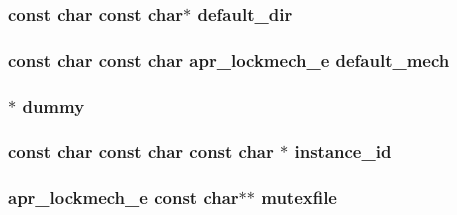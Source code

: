\subsubsection[{\texorpdfstring{default\+\_\+dir}{default_dir}}]{\setlength{\rightskip}{0pt plus 5cm}const char const char$\ast$ default\+\_\+dir}\hypertarget{group__APACHE__CORE__MUTEX_ga56289591e4fc9deed24a16663299f5ea}{}\label{group__APACHE__CORE__MUTEX_ga56289591e4fc9deed24a16663299f5ea}
\subsubsection[{\texorpdfstring{default\+\_\+mech}{default_mech}}]{\setlength{\rightskip}{0pt plus 5cm}const char const char {\bf apr\+\_\+lockmech\+\_\+e} default\+\_\+mech}\hypertarget{group__APACHE__CORE__MUTEX_ga1a18ef0d888b24930ae6acf4619c2883}{}\label{group__APACHE__CORE__MUTEX_ga1a18ef0d888b24930ae6acf4619c2883}
\subsubsection[{\texorpdfstring{dummy}{dummy}}]{$\ast$ dummy}\hypertarget{group__APACHE__CORE__MUTEX_ga99dc3b67257851cb91efea473083cd0f}{}\label{group__APACHE__CORE__MUTEX_ga99dc3b67257851cb91efea473083cd0f}
\subsubsection[{\texorpdfstring{instance\+\_\+id}{instance_id}}]{\setlength{\rightskip}{0pt plus 5cm}const char const char const char $\ast$ instance\+\_\+id}\hypertarget{group__APACHE__CORE__MUTEX_ga896069af53580a2c53639ce00152f9e8}{}\label{group__APACHE__CORE__MUTEX_ga896069af53580a2c53639ce00152f9e8}
\subsubsection[{\texorpdfstring{mutexfile}{mutexfile}}]{ {\bf apr\+\_\+lockmech\+\_\+e} const char$\ast$$\ast$ mutexfile}\hypertarget{group__APACHE__CORE__MUTEX_gaa4b7af5163be82f815eb2e47c2b4480e}{}\label{group__APACHE__CORE__MUTEX_gaa4b7af5163be82f815eb2e47c2b4480e}
